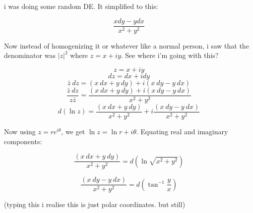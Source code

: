 \documentclass[11]{article}
\title{\sc{I Dislike Differential Equations}}
\author{\sc{Rahul}}
\date{26 April, 2025}
\begin{document}
\maketitle
i was doing some random DE. It simplified to this:

$$\frac{x dy - y dx}{x^2 + y^2}$$

Now instead of homogenizing it or whatever like a normal person, i saw that the denominator was $|z|^2$ where $z = x+iy$. See where i'm going with this?

$$z = x + iy$$
$$dz = dx + i dy$$
$$\bar{z} \ dz = (x \ dx + y \ dy) + i (x \ dy - y \ dx)$$
$$\frac{\bar{z} \ dz}{z \bar{z}} = \frac{(x \ dx + y \ dy) + i (x \ dy - y \ dx)}{x^2 + y^2}$$
$$ d(\ln z) =  \frac{(x \ dx + y \ dy)}{x^2 + y^2} + i \frac{(x \ dy - y \ dx)}{x^2 + y^2}$$

Now using $z = r e^{i \theta}$, we get $\ln z = \ln r + i \theta$. Equating real and imaginary components:

$$\boxed{ \frac{(x \ dx + y \ dy)}{x^2 + y^2} = d(\ln \sqrt{x^2+y^2})}$$

$$\boxed{\frac{(x \ dy - y \ dx)}{x^2 + y^2} = d\left(\tan^{-1} \frac{y}{x}\right)}$$

(typing this i realise this is just polar coordinates. but still)
\end{document}
